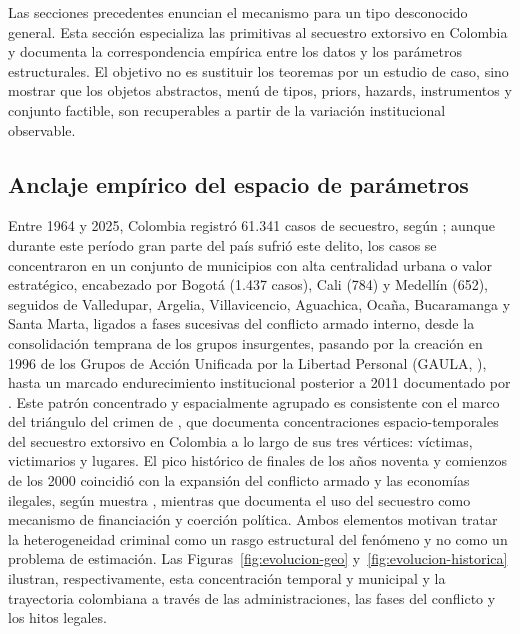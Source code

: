 \documentclass[review,authoryear,12pt]{elsarticle}
\theoremstyle{plain}
\theoremstyle{definition}
\newcommand{\1}{\mathbf{1}}
\begin{document}
Las secciones precedentes enuncian el mecanismo para un tipo desconocido general. Esta sección especializa las primitivas al secuestro extorsivo en Colombia y documenta la correspondencia empírica entre los datos y los parámetros estructurales. El objetivo no es sustituir los teoremas por un estudio de caso, sino mostrar que los objetos abstractos, menú de tipos, priors, hazards, instrumentos y conjunto factible, son recuperables a partir de la variación institucional observable.

\subsection{Anclaje empírico del espacio de parámetros}\label{sec:institutional}

Entre 1964 y 2025, Colombia registró 61.341 casos de secuestro, según \citet{cnmh_datos}; aunque durante este período gran parte del país sufrió este delito, los casos se concentraron en un conjunto de municipios con alta centralidad urbana o valor estratégico, encabezado por Bogotá (1.437 casos), Cali (784) y Medellín (652), seguidos de Valledupar, Argelia, Villavicencio, Aguachica, Ocaña, Bucaramanga y Santa Marta, ligados a fases sucesivas del conflicto armado interno, desde la consolidación temprana de los grupos insurgentes, pasando por la creación en 1996 de los Grupos de Acción Unificada por la Libertad Personal (GAULA, \citealt{ley282_1996}), hasta un marcado endurecimiento institucional posterior a 2011 documentado por \citet{CNMH2013}. Este patrón concentrado y espacialmente agrupado es consistente con el marco del triángulo del crimen de \citet{Pires2014}, que documenta concentraciones espacio-temporales del secuestro extorsivo en Colombia a lo largo de sus tres vértices: víctimas, victimarios y lugares. El pico histórico de finales de los años noventa y comienzos de los 2000 coincidió con la expansión del conflicto armado y las economías ilegales, según muestra \citet{pinto2004}, mientras que \citet{Zarate2007} documenta el uso del secuestro como mecanismo de financiación y coerción política. Ambos elementos motivan tratar la heterogeneidad criminal como un rasgo estructural del fenómeno y no como un problema de estimación. Las Figuras~\ref{fig:evolucion-geo} y~\ref{fig:evolucion-historica} ilustran, respectivamente, esta concentración temporal y municipal y la trayectoria colombiana a través de las administraciones, las fases del conflicto y los hitos legales.
\end{document}
